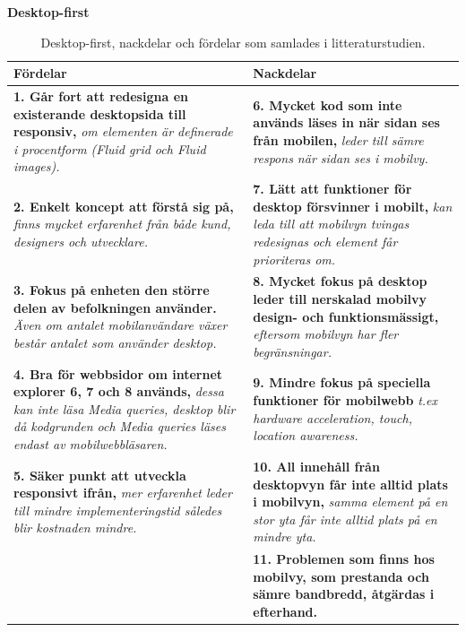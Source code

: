 \documentclass[11pt]{article}
\begin{document}
\textbf{Desktop-first}
\begin{table}[H]
\centering
\begin{tabular}{|p{7.2cm}|p{7.2cm}|}
\hline
Fördelar&Nackdelar\\ \hline
\textbf{1. Går fort att redesigna en existerande desktopsida till responsiv, }\textit{om elementen är definerade i procentform (Fluid grid och Fluid images).}&\textbf{6. Mycket kod som inte används läses in när sidan ses från mobilen, }\textit{leder till sämre respons när sidan ses i mobilvy.}\\ \hline
\textbf{2. Enkelt koncept att förstå sig på, }\textit{finns mycket erfarenhet från både kund, designers och utvecklare.}& \textbf{7. Lätt att funktioner för desktop försvinner i mobilt,} \textit{kan leda till att mobilvyn tvingas redesignas och element får prioriteras om.} \\ \hline
\textbf{3. Fokus på enheten den större delen av befolkningen använder. }\textit{Även om antalet mobilanvändare växer består antalet som använder desktop.}&\textbf{8. Mycket fokus på desktop leder till nerskalad mobilvy design- och funktionsmässigt, }\textit{eftersom mobilvyn har fler begränsningar.}\\ \hline
\textbf{4. Bra för webbsidor om internet explorer 6, 7 och 8 används, }\textit{dessa kan inte läsa Media queries, desktop blir då kodgrunden och Media queries läses endast av mobilwebbläsaren.}&  \textbf{9. Mindre fokus  på speciella funktioner för mobilwebb} \textit{t.ex hardware acceleration, touch, location awareness.} \\ \hline
\textbf{5. Säker punkt att utveckla responsivt ifrån, }\textit{mer erfarenhet leder till mindre implementeringstid således blir kostnaden mindre.}&\textbf{10. All innehåll från desktopvyn får inte alltid plats i mobilvyn,} \textit{samma element på en stor yta får inte alltid plats på en mindre yta.}\\ \hline
~&\textbf{11. Problemen som finns hos mobilvy, som prestanda och sämre bandbredd, åtgärdas i efterhand.}\\ \hline


    \end{tabular}
    \caption {Desktop-first, nackdelar och fördelar som samlades i litteraturstudien.}
\end{table}
\end{document}
